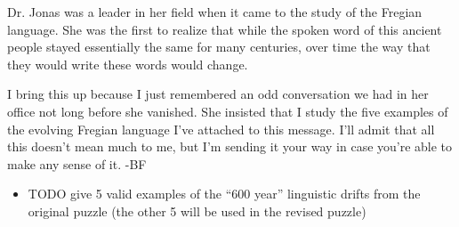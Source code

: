 Dr. Jonas was a leader in her field when it came to the study of
the Fregian language. She was the first to realize that while the
spoken word of this ancient people stayed essentially the same
for many centuries, over time the way that they would write
these words would change.

I bring this up because I just remembered an odd conversation
we had in her office not long before she vanished. She insisted
that I study the five examples of the evolving Fregian language
I've attached to this message. I'll admit that all this doesn't mean
much to me, but I'm sending it your way in case you're able to
make any sense of it. -BF

\begin{itemize}
\item
  TODO give 5 valid examples of the ``600 year'' linguistic drifts
  from the original puzzle (the other 5 will be used in the revised puzzle)
\end{itemize}


